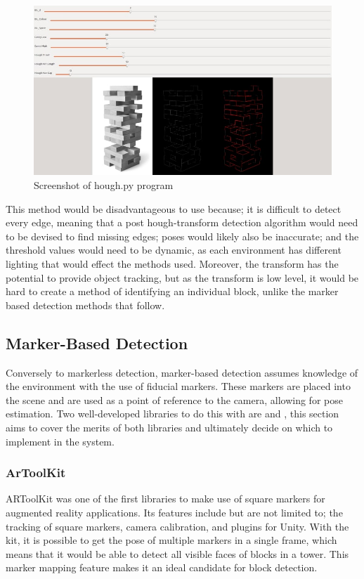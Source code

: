 \begin{figure}[ht]
    \centering
    \includegraphics[width=.7\linewidth]{images/litreview/python-houghlines}
    \caption{Screenshot of hough.py program}
    \label{fig:houghscreenshot}
\end{figure}

This method would be disadvantageous to use because; it is difficult to detect every edge, meaning that a post hough-transform detection algorithm would need to be devised to find missing edges; poses would likely also be inaccurate; and the threshold values would need to be dynamic, as each environment has different lighting that would effect the methods used. Moreover, the transform has the potential to provide object tracking, but as the transform is low level, it would be hard to create a method of identifying an individual block, unlike the marker based detection methods that follow.

\subsection{Marker-Based Detection}\label{sec:markerbased}

Conversely to markerless detection, marker-based detection assumes knowledge of the environment with the use of fiducial markers. These markers are placed into the scene and are used as a point of reference to the camera, allowing for pose estimation. Two well-developed libraries to do this with are  and , this section aims to cover the merits of both libraries and ultimately decide on which to implement in the system.

\subsubsection{ArToolKit}\label{subsec:artoolkit}

ARToolKit was one of the first libraries to make use of square markers for augmented reality applications. Its features include but are not limited to; the tracking of square markers, camera calibration, and plugins for Unity. With the kit, it is possible to get the pose of multiple markers in a single frame, which means that it would be able to detect all visible faces of blocks in a \jenga{} tower. This marker mapping feature makes it an ideal candidate for block detection.

